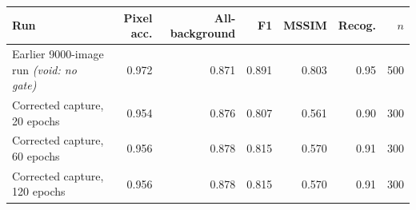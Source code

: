 \begin{tabular}{lrrrrrr}
\hline
Run & Pixel acc. & All-background & F1 & MSSIM & Recog. & $n$ \\
\hline
Earlier 9000-image run \emph{(void: no gate)} & 0.972 & 0.871 & 0.891 & 0.803 & 0.95 & 500 \\
Corrected capture, 20 epochs & 0.954 & 0.876 & 0.807 & 0.561 & 0.90 & 300 \\
Corrected capture, 60 epochs & 0.956 & 0.878 & 0.815 & 0.570 & 0.91 & 300 \\
Corrected capture, 120 epochs & 0.956 & 0.878 & 0.815 & 0.570 & 0.91 & 300 \\
\hline
\end{tabular}
